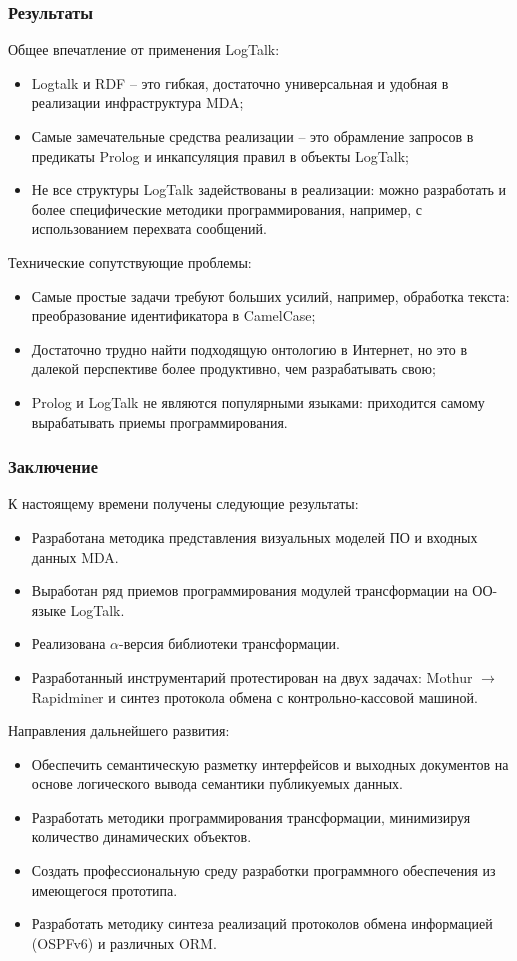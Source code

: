 \documentclass[10pt]{beamer}
\begin{document}
\begin{frame}
  \frametitle{Результаты}
  Общее впечатление от применения LogTalk:
  \begin{itemize}
  \item Logtalk и RDF -- это гибкая, достаточно универсальная и удобная в реализации инфраструктура MDA;
  \item Самые замечательные средства реализации -- это обрамление запросов в предикаты Prolog и инкапсуляция правил в объекты LogTalk;
  \item Не все структуры LogTalk задействованы в реализации: можно разработать и более специфические методики программирования, например, с использованием перехвата сообщений.
  \end{itemize}
  Технические сопутствующие проблемы:
  \begin{itemize}
  \item Самые простые задачи требуют больших усилий, например, обработка текста: преобразование идентификатора в CamelCase;
  \item Достаточно трудно найти подходящую онтологию в Интернет, но это в далекой перспективе более продуктивно, чем разрабатывать свою;
  \item Prolog и LogTalk не являются популярными языками: приходится самому вырабатывать приемы программирования.
  \end{itemize}
\end{frame}

\begin{frame}
  \frametitle{Заключение}
  К настоящему времени получены следующие результаты:
  \begin{itemize}
  \item Разработана методика представления визуальных моделей ПО и входных данных MDA.
  \item Выработан ряд приемов программирования модулей трансформации на ОО-языке LogTalk.
  \item Реализована $\alpha$-версия библиотеки трансформации.
  \item Разработанный инструментарий протестирован на двух задачах: Mothur $\to$ Rapidminer и синтез протокола обмена с контрольно-кассовой машиной.
  \end{itemize}
  Направления дальнейшего развития:
  \begin{itemize}
  \item Обеспечить семантическую разметку интерфейсов и выходных документов на основе логического вывода семантики публикуемых данных.
  \item Разработать методики программирования трансформации, минимизируя количество динамических объектов.
  \item Создать профессиональную среду разработки программного обеспечения из имеющегося прототипа.
  \item Разработать методику синтеза реализаций протоколов обмена информацией (OSPFv6) и различных ORM.
  \end{itemize}
\end{frame}
\end{document}
